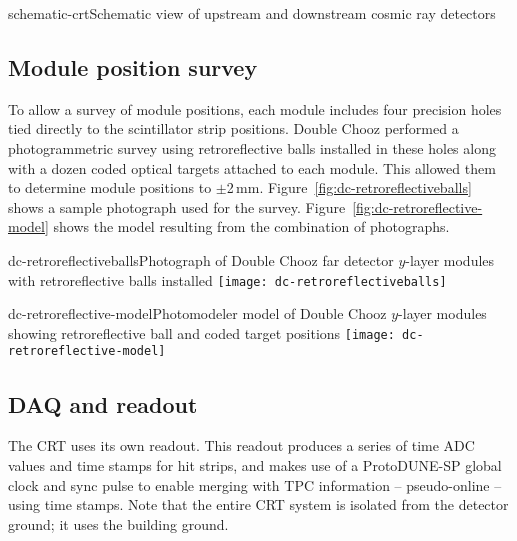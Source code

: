 \begin{cdrfigure}{schematic-crt}{Schematic view of upstream and downstream cosmic ray detectors}
\end{cdrfigure}


\subsection{Module position survey}

To allow a survey of module positions, each module includes four precision holes tied 
directly to the scintillator strip positions. Double Chooz performed a photogrammetric survey using retroreflective balls installed in these holes along with a dozen coded optical targets attached to each module. This allowed them to determine module positions to $\pm$2\,mm. Figure~\ref{fig:dc-retroreflectiveballs} shows a sample photograph used for the survey. Figure~\ref{fig:dc-retroreflective-model} shows the model resulting from the combination of photographs.

\begin{cdrfigure}{dc-retroreflectiveballs}{Photograph of Double Chooz far detector $y$-layer modules with retroreflective balls installed}
  \texttt{[image: dc-retroreflectiveballs]}
\end{cdrfigure}


\begin{cdrfigure}{dc-retroreflective-model}{Photomodeler model of Double Chooz $y$-layer modules showing retroreflective ball and coded target positions}
  \texttt{[image: dc-retroreflective-model]}
\end{cdrfigure}


\subsection{DAQ and readout}

The CRT uses its own readout. This readout produces a series of time ADC values and time stamps for hit strips, and makes use of a ProtoDUNE-SP global clock and sync pulse to enable merging with TPC information -- pseudo-online -- using time stamps. Note that the entire CRT system is isolated from the detector ground; it uses the building ground.

